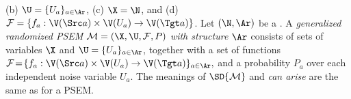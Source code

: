 \begin{defn}
{  (b) $\U = \{ U_a \}_{a \in \Ar}$, (c) $\X = \N$, and (d)
      $ \mathcal F = \{
  f_a : \V(\Src a) \times \V(U_a) \to \V(\Tgt a)    \}$.
}
    Let $(\N, \Ar)$ be a \hgraph. 
    A \emph{generalized randomized PSEM}
     $\mathcal M = (\X, \U, \mathcal F, P)$
    \emph{with
    structure
    $\Ar$} consists of
    sets of variables $\X$ 
    and $\U = \{ U_a \}_{a \in \Ar}$, 
    together with a set of functions
    $ \mathcal F \!=\! \{
            f_a : \V(\Src a) \times \V(U_a) \to \V(\Tgt a)
    \}_{a \in \Ar},
    $
    and a probability $P_a$ over each independent noise variable $U_a$.
    The meanings of $\SD{\cal M}$ and \emph{can arise} are the same as for a PSEM.
\end{defn}

